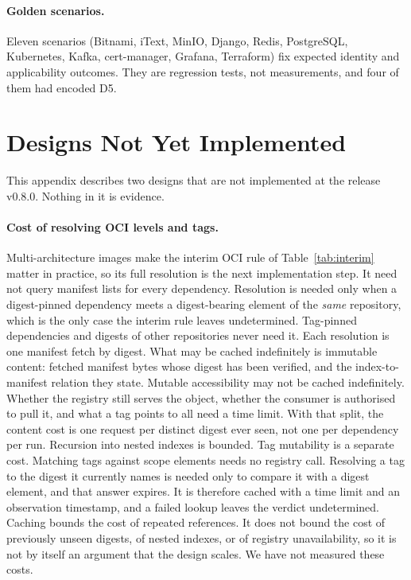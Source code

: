 \documentclass[11pt,a4paper]{article}
\newcommand{\release}{v0.8.0}
\begin{document}
\paragraph{Golden scenarios.} Eleven scenarios (Bitnami, iText, MinIO,
Django, Redis, PostgreSQL, Kubernetes, Kafka, cert-manager, Grafana,
Terraform) fix expected identity and applicability outcomes. They are
regression tests, not measurements, and four of them had encoded D5.

\section{Designs Not Yet Implemented}
\label{app:designs}
This appendix describes two designs that are not implemented at the
release \release{}. Nothing in it is evidence.

\paragraph{Cost of resolving OCI levels and tags.} Multi-architecture
images make the interim OCI rule of Table~\ref{tab:interim} matter in
practice, so its full resolution is the next implementation step. It
need not query manifest lists for every dependency. Resolution is needed only when a digest-pinned
dependency meets a digest-bearing element of the \emph{same}
repository, which is the only case the interim rule leaves
undetermined. Tag-pinned dependencies and digests of other
repositories never need it. Each resolution is one manifest fetch by
digest. What may be cached indefinitely is immutable content: fetched
manifest bytes whose digest has been verified, and the index-to-manifest
relation they state. Mutable accessibility may not be cached
indefinitely. Whether the registry still serves the object, whether the
consumer is authorised to pull it, and what a tag points to all need a
time limit. With that split, the content cost is one request per distinct
digest ever seen, not one per dependency per run. Recursion into nested
indexes is bounded. Tag mutability is a separate cost. Matching tags
against scope elements needs no registry call. Resolving a tag to the
digest it currently names is needed only to compare it with a digest
element, and that answer expires. It is therefore cached with a time
limit and an observation timestamp, and a failed lookup leaves the
verdict undetermined. Caching bounds the cost of repeated references.
It does not bound the cost of previously unseen digests, of nested
indexes, or of registry unavailability, so it is not by itself an
argument that the design scales. We have not measured these costs.
\end{document}
